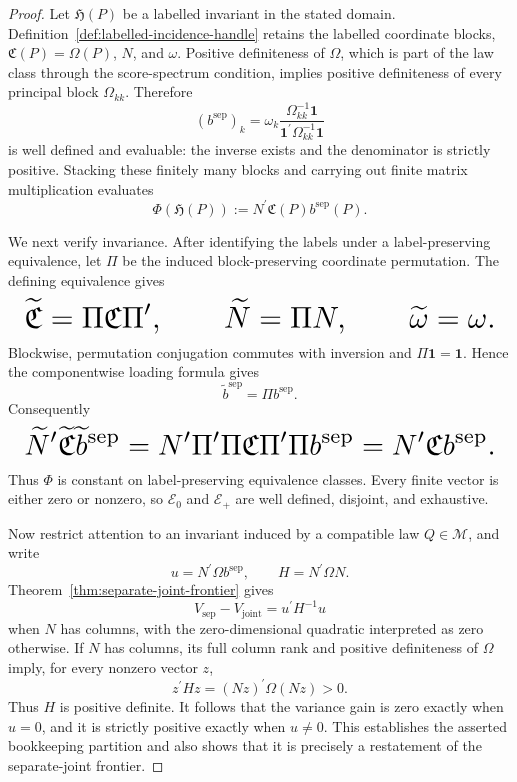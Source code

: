 \documentclass{article}
\begin{document}
\begin{proof}
Let \(\mathfrak H(P)\) be a labelled invariant in the stated domain. Definition~\ref{def:labelled-incidence-handle} retains the labelled coordinate blocks, \(\mathfrak C(P)=\Omega(P)\), \(N\), and \(\omega\). Positive definiteness of \(\Omega\), which is part of the law class through the score-spectrum condition, implies positive definiteness of every principal block \(\Omega_{kk}\). Therefore
\[
 (b^{\mathrm{sep}})_k
 =\omega_k\frac{\Omega_{kk}^{-1}\mathbf 1}
 {\mathbf 1^{\prime}\Omega_{kk}^{-1}\mathbf 1}
\]
is well defined and evaluable: the inverse exists and the denominator is strictly positive. Stacking these finitely many blocks and carrying out finite matrix multiplication evaluates
\[
 \Phi(\mathfrak H(P))
 :=N^{\prime}\mathfrak C(P)b^{\mathrm{sep}}(P).
\]

We next verify invariance. After identifying the labels under a label-preserving equivalence, let \(\Pi\) be the induced block-preserving coordinate permutation. The defining equivalence gives
\[
\makebox[\linewidth][c]{\resizebox{0.98\linewidth}{!}{\(\displaystyle \widetilde{\mathfrak C}=\Pi\mathfrak C\Pi^{\prime},
 \qquad
 \widetilde N=\Pi N,
 \qquad
 \widetilde\omega=\omega.\)}}
\]
Blockwise, permutation conjugation commutes with inversion and \(\Pi\mathbf 1=\mathbf 1\). Hence the componentwise loading formula gives
\[
 \widetilde b^{\mathrm{sep}}=\Pi b^{\mathrm{sep}}.
\]
Consequently
\[
\makebox[\linewidth][c]{\resizebox{0.98\linewidth}{!}{\(\displaystyle \widetilde N^{\prime}\widetilde{\mathfrak C}
 \widetilde b^{\mathrm{sep}}
 =N^{\prime}\Pi^{\prime}\Pi\mathfrak C\Pi^{\prime}\Pi
 b^{\mathrm{sep}}
 =N^{\prime}\mathfrak Cb^{\mathrm{sep}}.\)}}
\]
Thus \(\Phi\) is constant on label-preserving equivalence classes. Every finite vector is either zero or nonzero, so \(\mathscr E_0\) and \(\mathscr E_+\) are well defined, disjoint, and exhaustive.

Now restrict attention to an invariant induced by a compatible law \(Q\in\mathcal M\), and write
\[
 u=N^{\prime}\Omega b^{\mathrm{sep}},
 \qquad
 H=N^{\prime}\Omega N.
\]
Theorem~\ref{thm:separate-joint-frontier} gives
\[
 V_{\mathrm{sep}}-V_{\mathrm{joint}}=u^{\prime}H^{-1}u
\]
when \(N\) has columns, with the zero-dimensional quadratic interpreted as zero otherwise. If \(N\) has columns, its full column rank and positive definiteness of \(\Omega\) imply, for every nonzero vector \(z\),
\[
 z^{\prime}Hz=(Nz)^{\prime}\Omega(Nz)>0.
\]
Thus \(H\) is positive definite. It follows that the variance gain is zero exactly when \(u=0\), and it is strictly positive exactly when \(u\ne0\). This establishes the asserted bookkeeping partition and also shows that it is precisely a restatement of the separate-joint frontier.


\end{proof}
\end{document}
